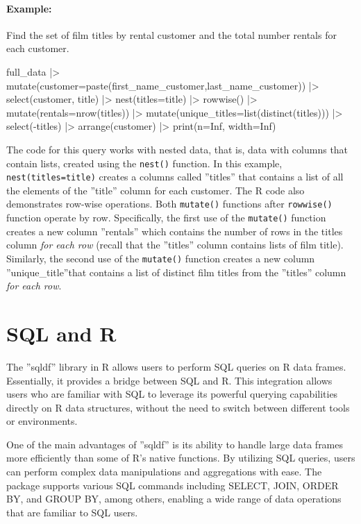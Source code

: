 \paragraph*{Example:} Find the set of film titles by rental customer and the total number rentals for each customer.

\begin{samepage}
\begin{Rcode}
full_data |>
  mutate(customer=paste(first_name_customer,last_name_customer)) |>
  select(customer, title) |>
  nest(titles=title) |>
  rowwise() |> 
  mutate(rentals=nrow(titles)) |>
  mutate(unique_titles=list(distinct(titles))) |>
  select(-titles) |>
  arrange(customer) |>
  print(n=Inf, width=Inf)
\end{Rcode}
\end{samepage}

The code for this query works with nested data, that is, data with columns that contain lists, created using the \texttt{nest()} function. In this example, \texttt{nest(titles=title)} creates a columns called ''titles'' that contains a list of all the elements of the ''title'' column for each customer. The R code also demonstrates row-wise operations. Both \texttt{mutate()} functions after \texttt{rowwise()} function operate by row. Specifically, the first use of the \texttt{mutate()} function creates a new column ''rentals'' which contains the number of rows in the titles column \emph{for each row} (recall that the ''titles'' column contains lists of film title). Similarly, the second use of the \texttt{mutate()} function creates a new column ''unique\_title''that contains a list of distinct film titles from the ''titles'' column \emph{for each row}.

\section{SQL and R}

The ''sqldf'' library in R allows users to perform SQL queries on R data frames. Essentially, it provides a bridge between SQL and R. This integration allows users who are familiar with SQL to leverage its powerful querying capabilities directly on R data structures, without the need to switch between different tools or environments.

One of the main advantages of ''sqldf'' is its ability to handle large data frames more efficiently than some of R's native functions. By utilizing SQL queries, users can perform complex data manipulations and aggregations with ease. The package supports various SQL commands including SELECT, JOIN, ORDER BY, and GROUP BY, among others, enabling a wide range of data operations that are familiar to SQL users.

